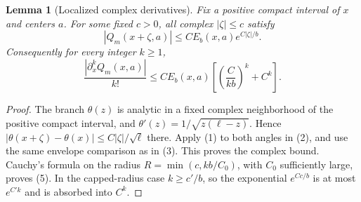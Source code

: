 \documentclass[11pt]{article}
\newtheorem{lemma}{Lemma}\newtheorem{theorem}{Theorem}
\begin{document}
\begin{lemma}[Localized complex derivatives]\label{derivatives}
Fix a positive compact interval of $x$ and centers $a$.
For some fixed $c>0$, all complex $|\zeta|\le c$ satisfy
\[
 |Q_m(x+\zeta,a)|\le C E_b(x,a)e^{C|\zeta|/b}.
\]
Consequently for every integer $k\ge1$,
\[
 \frac{|\partial_x^k Q_m(x,a)|}{k!}
 \le C E_b(x,a)\left[\left(\frac C{kb}\right)^k+C^k\right].
                                                                    \tag{5}
\]
\end{lemma}
\begin{proof}
The branch $\theta(z)$ is analytic in a fixed complex neighborhood
of the positive compact interval, and
$\theta'(z)=1/\sqrt{z(\ell-z)}$. Hence
$|\theta(x+\zeta)-\theta(x)|\le C|\zeta|/\sqrt\ell$ there.
Apply (1) to both angles in (2), and use the same envelope comparison
as in (3). This proves the complex bound.
Cauchy's formula on the radius
$R=\min(c,kb/C_0)$, with $C_0$ sufficiently large, proves (5).
In the capped-radius case $k\ge c'/b$, so the exponential
$e^{Cc/b}$ is at most $e^{C'k}$ and is absorbed into $C^k$.
\end{proof}
\end{document}
